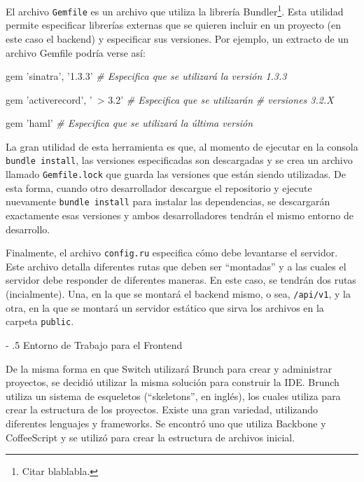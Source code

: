 \documentclass[12pt,titlepage,]{article}
\makeatletter
\newenvironment{Shaded}{}{}
\newcommand{\StringTok}[1]{\textcolor[rgb]{0.25,0.44,0.63}{{#1}}}
\newcommand{\CommentTok}[1]{\textcolor[rgb]{0.38,0.63,0.69}{\textit{{#1}}}}
\newcommand{\NormalTok}[1]{{#1}}
\renewcommand\paragraph{%
   \@startsection{paragraph}{4}{0mm}%
      {-\baselineskip}%
      {.5\baselineskip}%
      {\normalfont\normalsize\bfseries}}
\makeatother
\begin{document}
El archivo \texttt{Gemfile} es un archivo que utiliza la librería
Bundler\footnote{Citar blablabla.}. Esta utilidad permite especificar
librerías externas que se quieren incluir en un proyecto (en este caso
el backend) y especificar sus versiones. Por ejemplo, un extracto de un
archivo Gemfile podría verse así:

\begin{Shaded}
\begin{Highlighting}[]
\NormalTok{gem }\StringTok{'sinatra'}\NormalTok{, }\StringTok{'1.3.3'} \CommentTok{# Especifica que se utilizará la versión 1.3.3}

\NormalTok{gem }\StringTok{'activerecord'}\NormalTok{, }\StringTok{'~> 3.2'} \CommentTok{# Especifica que se utilizarán }
                             \CommentTok{# versiones 3.2.X}

\NormalTok{gem }\StringTok{'haml'} \CommentTok{# Especifica que se utilizará la última versión}
\end{Highlighting}
\end{Shaded}

La gran utilidad de esta herramienta es que, al momento de ejecutar en
la consola \texttt{bundle install}, las versiones especificadas son
descargadas y se crea un archivo llamado \texttt{Gemfile.lock} que
guarda las versiones que están siendo utilizadas. De esta forma, cuando
otro desarrollador descargue el repositorio y ejecute nuevamente
\texttt{bundle install} para instalar las dependencias, se descargarán
exactamente esas versiones y ambos desarrolladores tendrán el mismo
entorno de desarrollo.

Finalmente, el archivo \texttt{config.ru} especifica cómo debe
levantarse el servidor. Este archivo detalla diferentes rutas que deben
ser ``montadas'' y a las cuales el servidor debe responder de diferentes
maneras. En este caso, se tendrán dos rutas (incialmente). Una, en la
que se montará el backend mismo, o sea, \texttt{/api/v1}, y la otra, en
la que se montará un servidor estático que sirva los archivos en la
carpeta \texttt{public}.

\paragraph{Entorno de Trabajo para el Frontend}

De la misma forma en que Switch utilizará Brunch para crear y
administrar proyectos, se decidió utilizar la misma solución para
construir la IDE. Brunch utiliza un sistema de esqueletos
(``skeletons'', en inglés), los cuales utiliza para crear la estructura
de los proyectos. Existe una gran variedad, utilizando diferentes
lenguajes y frameworks. Se encontró uno que utiliza Backbone y
CoffeeScript y se utilizó para crear la estructura de archivos inicial.
\end{document}
